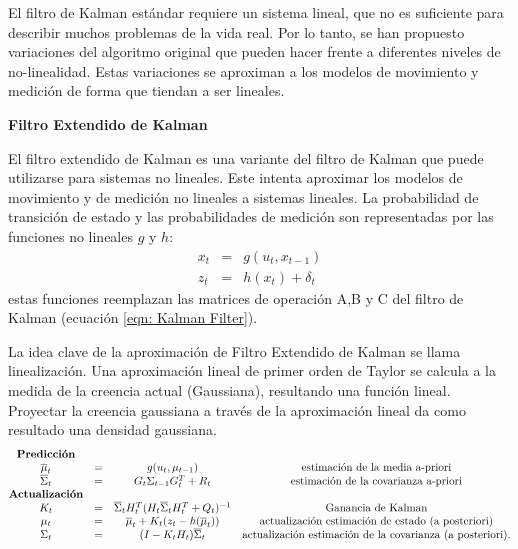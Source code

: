 El filtro de Kalman estándar requiere un sistema lineal, que no es suficiente para describir muchos problemas de la vida real. Por lo tanto, se han propuesto variaciones del algoritmo original que pueden hacer frente a diferentes niveles de no-linealidad. Estas variaciones se aproximan a los modelos de movimiento y medición de forma que tiendan a ser lineales.

\textbf{Filtro Extendido de Kalman}

El filtro extendido de Kalman es una variante del filtro de Kalman que puede utilizarse para sistemas no lineales. Este intenta aproximar los modelos de movimiento y de medición no lineales a sistemas lineales. La probabilidad de transición de estado y las probabilidades de medición son representadas por las funciones no lineales $g$ y $h$:
\begin{equation}
\begin{matrix}
x_{t} &= & g(u_{t},x_{t-1})\\
z_{t} &= & h(x_{t}) + \delta_{t}
\end{matrix}
\end{equation}
estas funciones reemplazan las matrices de operación A,B y C del filtro de Kalman (ecuación \ref{eqn: Kalman Filter}).

La idea clave de la aproximación de Filtro Extendido de Kalman se llama linealización. Una aproximación lineal de primer orden de Taylor se calcula a la medida de la creencia actual (Gaussiana), resultando una función lineal. Proyectar la creencia gaussiana a través de la aproximación lineal da como resultado una densidad gaussiana.
\begin{equation}
\begin{matrix}
\textrm{\textbf{Predicción}}\\
\overline{\mu}_{t} &= &g(u_{t},\mu_{t-1}) &\textrm{estimación de la media a-priori}\\
\overline{\Sigma}_{t} &= &G_{t}\Sigma_{t-1}G_{t}^T + R_{t} &\textrm{estimación de la covarianza a-priori}\\
\textrm{\textbf{Actualización}}\\
K_{t} &= &\overline{\Sigma}_{t}H_{t}^{T}(H_{t}\overline{\Sigma}_{t}H_{t}^{T} + Q_{t})^{-1} &\textrm{Ganancia de Kalman}\\
\mu_{t} &= &\overline{\mu}_{t} + K_{t}(z_{t} - h(\overline{\mu}_{t})) &\textrm{actualización estimación de estado (a posteriori)}\\
\Sigma_{t} &= &(I - K_{t}H_{t})\overline{\Sigma}_{t} &\textrm{actualización estimación de la covarianza (a posteriori)}.\\
\end{matrix}
\end{equation}

